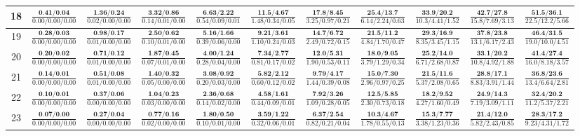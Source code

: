 \documentclass{slides}
\begin{document}
{{{\begin{tabular}{|c|c|c|c|c|c|c|c|c|c|c|}
\hline
18 & $\frac{\textbf{0.41/0.04}}{0.00/0.00/0.00}$ & $\frac{\textbf{1.36/0.24}}{0.02/0.00/0.00}$ & $\frac{\textbf{3.32/0.86}}{0.14/0.01/0.00}$ & $\frac{\textbf{6.63/2.22}}{0.54/0.09/0.01}$ & $\frac{\textbf{11.5/4.67}}{1.48/0.34/0.05}$ & $\frac{\textbf{17.8/8.45}}{3.25/0.97/0.21}$ & $\frac{\textbf{25.4/13.7}}{6.14/2.24/0.63}$ & $\frac{\textbf{33.9/20.2}}{10.3/4.41/1.52}$ & $\frac{\textbf{42.7/27.8}}{15.8/7.69/3.13}$ & $\frac{\textbf{51.5/36.1}}{22.5/12.2/5.66}$ \\
\hline
19 & $\frac{\textbf{0.28/0.03}}{0.00/0.00/0.00}$ & $\frac{\textbf{0.98/0.17}}{0.01/0.00/0.00}$ & $\frac{\textbf{2.50/0.62}}{0.10/0.01/0.00}$ & $\frac{\textbf{5.16/1.66}}{0.39/0.06/0.00}$ & $\frac{\textbf{9.21/3.61}}{1.10/0.24/0.03}$ & $\frac{\textbf{14.7/6.72}}{2.49/0.72/0.15}$ & $\frac{\textbf{21.5/11.2}}{4.84/1.70/0.47}$ & $\frac{\textbf{29.3/16.9}}{8.35/3.45/1.15}$ & $\frac{\textbf{37.8/23.8}}{13.1/6.17/2.43}$ & $\frac{\textbf{46.4/31.5}}{19.0/10.0/4.51}$ \\
\hline
20 & $\frac{\textbf{0.20/0.02}}{0.00/0.00/0.00}$ & $\frac{\textbf{0.71/0.12}}{0.01/0.00/0.00}$ & $\frac{\textbf{1.87/0.45}}{0.07/0.01/0.00}$ & $\frac{\textbf{4.00/1.24}}{0.28/0.04/0.00}$ & $\frac{\textbf{7.34/2.77}}{0.81/0.17/0.02}$ & $\frac{\textbf{12.0/5.31}}{1.90/0.53/0.11}$ & $\frac{\textbf{18.0/9.05}}{3.79/1.29/0.34}$ & $\frac{\textbf{25.2/14.0}}{6.71/2.68/0.87}$ & $\frac{\textbf{33.1/20.2}}{10.8/4.92/1.88}$ & $\frac{\textbf{41.4/27.4}}{16.0/8.18/3.57}$ \\
\hline
21 & $\frac{\textbf{0.14/0.01}}{0.00/0.00/0.00}$ & $\frac{\textbf{0.51/0.08}}{0.01/0.00/0.00}$ & $\frac{\textbf{1.40/0.32}}{0.05/0.00/0.00}$ & $\frac{\textbf{3.08/0.92}}{0.20/0.03/0.00}$ & $\frac{\textbf{5.82/2.12}}{0.60/0.12/0.02}$ & $\frac{\textbf{9.79/4.17}}{1.44/0.39/0.08}$ & $\frac{\textbf{15.0/7.30}}{2.96/0.97/0.25}$ & $\frac{\textbf{21.5/11.6}}{5.37/2.08/0.65}$ & $\frac{\textbf{28.8/17.1}}{8.83/3.91/1.44}$ & $\frac{\textbf{36.8/23.6}}{13.4/6.64/2.81}$ \\
\hline
22 & $\frac{\textbf{0.10/0.01}}{0.00/0.00/0.00}$ & $\frac{\textbf{0.37/0.06}}{0.00/0.00/0.00}$ & $\frac{\textbf{1.04/0.23}}{0.03/0.00/0.00}$ & $\frac{\textbf{2.36/0.68}}{0.14/0.02/0.00}$ & $\frac{\textbf{4.58/1.61}}{0.44/0.09/0.01}$ & $\frac{\textbf{7.92/3.26}}{1.09/0.28/0.05}$ & $\frac{\textbf{12.5/5.85}}{2.30/0.73/0.18}$ & $\frac{\textbf{18.2/9.52}}{4.27/1.60/0.49}$ & $\frac{\textbf{24.9/14.3}}{7.19/3.09/1.11}$ & $\frac{\textbf{32.4/20.2}}{11.2/5.37/2.21}$ \\
\hline
23 & $\frac{\textbf{0.07/0.00}}{0.00/0.00/0.00}$ & $\frac{\textbf{0.27/0.04}}{0.00/0.00/0.00}$ & $\frac{\textbf{0.77/0.16}}{0.02/0.00/0.00}$ & $\frac{\textbf{1.80/0.50}}{0.10/0.01/0.00}$ & $\frac{\textbf{3.59/1.22}}{0.32/0.06/0.01}$ & $\frac{\textbf{6.37/2.54}}{0.82/0.21/0.04}$ & $\frac{\textbf{10.3/4.67}}{1.78/0.55/0.13}$ & $\frac{\textbf{15.3/7.77}}{3.38/1.23/0.36}$ & $\frac{\textbf{21.4/12.0}}{5.82/2.43/0.85}$ & $\frac{\textbf{28.3/17.2}}{9.23/4.31/1.72}$ \\

\end{tabular}}}}
\end{document}
